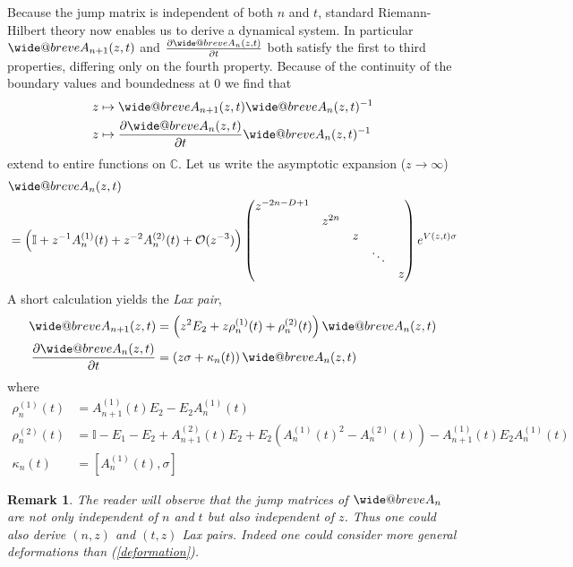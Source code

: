 \documentclass[12pt]{article}
\makeatletter
\def\widebreve{\mathpalette\wide@breve}
\def\wide@breve#1#2{\sbox\z@{$#1#2$}%
     \mathop{\vbox{\m@th\ialign{##\crcr
\kern0.08em\brevefill#1{0.8\wd\z@}\crcr\noalign{\nointerlineskip}%
                    $\hss#1#2\hss$\crcr}}}\limits}
\def\brevefill#1#2{$\m@th\sbox\tw@{$#1($}%
  \hss\resizebox{#2}{\wd\tw@}{\rotatebox[origin=c]{90}{\upshape(}}\hss$}
\newtheorem{remark}[theorem]{Remark}
\theoremstyle{definition}
\makeatother
\begin{document}
Because the jump matrix is independent of both $n$ and $t$, standard Riemann-Hilbert theory now enables us to derive a dynamical system. In particular $\widebreve{A}_{n+1}(z,t)$ and $\frac{\partial \widebreve{A}_{n}(z,t)}{\partial t}$ both satisfy the first to third properties, differing only on the fourth property.  Because of the continuity of the boundary values and boundedness at $0$ we find that
\begin{align*}
z &\mapsto \widebreve{A}_{n+1}(z,t)\widebreve{A}_{n}(z,t)^{-1} \\
z &\mapsto \frac{\partial \widebreve{A}_{n}(z,t)}{\partial t}
\widebreve{A}_{n}(z,t)^{-1}
\end{align*}
extend to entire functions on $\mathbb{C}$.  Let us write the asymptotic expansion ($z \to \infty$)
\begin{align*}
&\widebreve{A}_{n}(z,t) \\
&= \left(\mathbb{I}+ z^{-1} A_{n}^{(1)}(t) + z^{-2} A_{n}^{(2)}(t) + \mathcal{O}(z^{-3})   \right) \left(\begin{matrix}
z^{-2n-D+1} \\
& z^{2n} \\
& & z \\
& & & \ddots  \\
& & & & z
\end{matrix} \right) e^{ V(z,t) \sigma}
\end{align*}
A short calculation yields the \textit{Lax pair},
\begin{align}
\widebreve{A}_{n+1}(z,t) &= \left( z^2 E_2 + z \rho_n^{(1)}(t) + \rho_n^{(2)}(t) \right) \widebreve{A}_{n}(z,t) \label{Laxpair1} \\
\frac{\partial \widebreve{A}_{n}(z,t)}{\partial t} &= \left( z \sigma + \kappa_n(t)   \right) \widebreve{A}_{n}(z,t) \label{Laxpair2}
\end{align}
where
\begin{align*}
\rho_n^{(1)}(t) &= A_{n+1}^{(1)}(t) E_2 - E_2 A_{n}^{(1)}(t) \\
\rho_n^{(2)}(t) &= \mathbb{I} - E_1 - E_2 + A_{n+1}^{(2)}(t) E_2 + E_2 \left( A_{n}^{(1)}(t)^2 - A_{n}^{(2)}(t) \right) - A_{n+1}^{(1)}(t) E_2 A_{n}^{(1)}(t) \\
\kappa_n(t) &= [A_{n}^{(1)}(t),\sigma]
\end{align*}
\begin{remark} The reader will observe that the jump matrices of $\widebreve{A}_n$ are not only independent of $n$ and $t$ but also independent of $z$. Thus one could also derive $(n,z)$ and $(t,z)$ Lax pairs.  Indeed one could consider more general deformations than (\ref{deformation}).
\end{remark}
\end{document}
